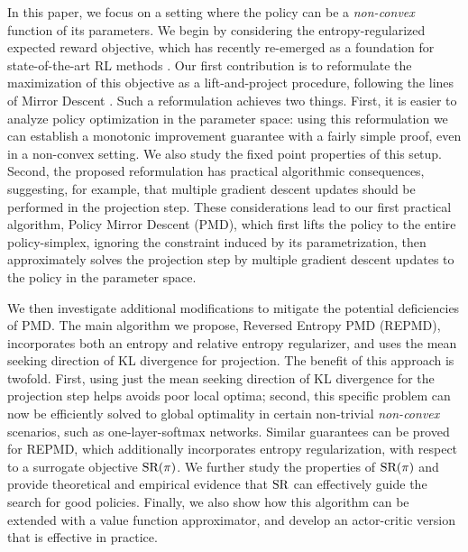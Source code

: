 In this paper, we focus on a setting where the policy can be
a \emph{non-convex} function of its parameters.
We begin by considering the entropy-regularized expected reward objective,
which has recently re-emerged as a foundation for state-of-the-art RL methods
\citep{williams1991function,fox2015taming,schulman2017equivalence,nachum2017bridging,haarnoja2017reinforcement}. 
Our first contribution is to reformulate the maximization of 
this objective as a lift-and-project procedure,
following the lines of Mirror Descent
\citep{nemirovskii1983problem,beck2003mirror}.
Such a reformulation achieves two things.
First, %
it is easier to analyze policy optimization
in the parameter space:
using this reformulation we can establish a monotonic improvement guarantee
with a fairly simple proof,
even in a non-convex setting.
We also study the fixed point properties of this setup.
Second, the proposed reformulation has practical algorithmic consequences,
suggesting, for example,
that multiple gradient descent updates should be performed
in the projection step.
These considerations lead to our first practical algorithm,
Policy Mirror Descent (PMD),
which first lifts the policy to the entire policy-simplex,
ignoring the constraint induced by its parametrization,
then approximately solves the projection step by multiple
gradient descent updates to the policy in the parameter space. 
%
%

We then investigate
additional modifications to mitigate the potential deficiencies of PMD.
The main algorithm we propose, Reversed Entropy PMD (REPMD),
incorporates both an entropy and relative entropy regularizer,
and uses the mean seeking direction of KL divergence for projection.
The benefit of this approach is twofold.
First, 
using just the mean seeking direction of KL divergence for the projection step
helps avoids poor local optima;
second,
this specific problem can now be efficiently solved to global optimality
in certain non-trivial \emph{non-convex} scenarios,
such as one-layer-softmax networks.
Similar guarantees can be proved for REPMD,
which additionally incorporates entropy regularization,
with respect to a surrogate objective $\text{SR}(\pi)$.
We further study the properties of $\text{SR}(\pi)$ and provide theoretical
and empirical evidence that $\text{SR}$ 
can effectively guide the search for good policies.
Finally, we also show how this algorithm can be extended 
with a value function approximator,
and develop an actor-critic version that is effective in practice.



